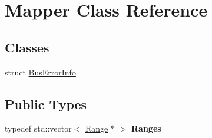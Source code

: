 \hypertarget{classMapper}{
\section{Mapper Class Reference}
\label{classMapper}
}
\subsection*{Classes}
\begin{DoxyCompactItemize}
\item 
struct \hyperlink{structMapper_1_1BusErrorInfo}{BusErrorInfo}
\end{DoxyCompactItemize}
\subsection*{Public Types}
\begin{DoxyCompactItemize}
\item 
\hypertarget{classMapper_a70bf3035f1c02611e55f05dfa7a80187}{
typedef std::vector$<$ \hyperlink{classRange}{Range} $\ast$ $>$ {\bfseries Ranges}}
\label{classMapper_a70bf3035f1c02611e55f05dfa7a80187}

\end{DoxyCompactItemize}
